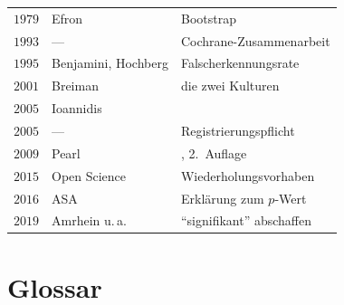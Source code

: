 \begin{merksatz}
\begin{center}
{\begin{tabular}{@{}P{1.4cm}P{2.8cm}P{4.0cm}@{}}
$1979$ & Efron & Bootstrap\\
$1993$ & --- & Cochrane-Zusammenarbeit\\
$1995$ & Benjamini, Hochberg & Falscherkennungsrate\\
$2001$ & Breiman & die zwei Kulturen\\
$2005$ & Ioannidis & \\
$2005$ & --- & Registrierungspflicht\\
$2009$ & Pearl & , 2.\ Auflage\\
$2015$ & Open Science & Wiederholungsvorhaben\\
$2016$ & ASA & Erklärung zum $p$-Wert\\
$2019$ & Amrhein u.\,a. & \enquote{signifikant} abschaffen\\
\bottomrule
\end{tabular}}
\end{center}
\end{merksatz}

\section{Glossar}

